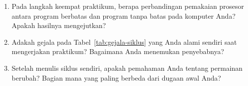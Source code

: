 \begin{refleksibox}
\begin{enumerate}
  \item Pada langkah keempat praktikum, berapa perbandingan pemakaian prosesor
        antara program berbatas dan program tanpa batas pada komputer Anda?
        Apakah hasilnya mengejutkan?
  \item Adakah gejala pada Tabel~\ref{tab:gejala-siklus} yang Anda alami
        sendiri saat mengerjakan praktikum? Bagaimana Anda menemukan
        penyebabnya?
  \item Setelah menulis siklus sendiri, apakah pemahaman Anda tentang permainan
        berubah? Bagian mana yang paling berbeda dari dugaan awal Anda?
\end{enumerate}
\end{refleksibox}
